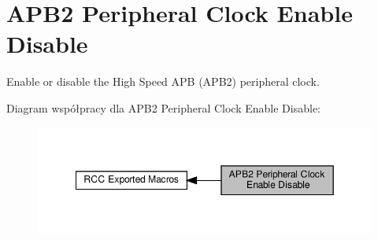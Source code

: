 \hypertarget{group___r_c_c___a_p_b2___clock___enable___disable}{}\section{A\+P\+B2 Peripheral Clock Enable Disable}
\label{group___r_c_c___a_p_b2___clock___enable___disable}


Enable or disable the High Speed A\+PB (A\+P\+B2) peripheral clock.  


Diagram współpracy dla A\+P\+B2 Peripheral Clock Enable Disable\+:\nopagebreak
\begin{figure}[H]
\begin{center}
\leavevmode
\includegraphics[width=349pt]{group___r_c_c___a_p_b2___clock___enable___disable}
\end{center}
\end{figure}
